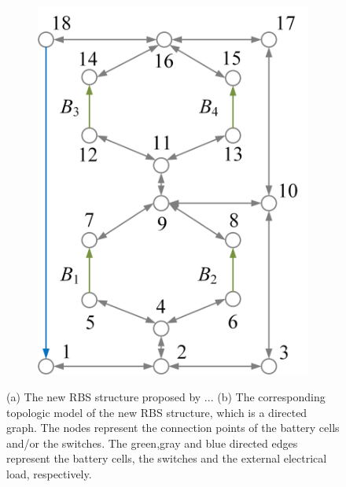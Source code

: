 \documentclass{article}
\begin{document}
\begin{figure}[htbp]
\begin{subfigure}[b]{0.45\textwidth}
        \includegraphics[width=\textwidth]{../attachments/ef-topo.png}
        \caption{}
        \label{fig:ef-topo}
    \end{subfigure}
    \caption{
        (a) The new RBS structure proposed  by ... %
        (b) The corresponding topologic model of the new RBS structure, which is a directed graph.
        The nodes represent the connection points of the battery cells and/or the switches.
        The green,gray and blue directed edges represent the battery cells, the switches and the external electrical load, respectively.
    }
\end{figure}
\end{document}
